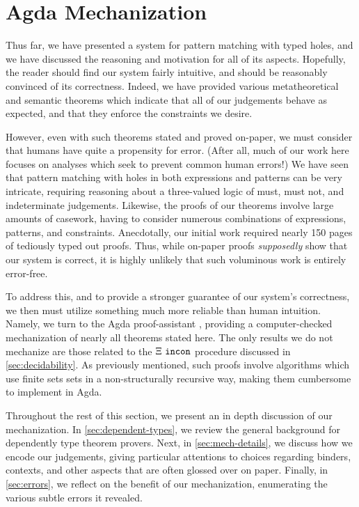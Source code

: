 \section{Agda Mechanization}\label{sec:mechanization}
Thus far, we have presented a system for pattern matching with typed holes, and we have discussed the reasoning and motivation for all of its aspects. Hopefully, the reader should find our system fairly intuitive, and should be reasonably convinced of its correctness. Indeed, we have provided various metatheoretical and semantic theorems which indicate that all of our judgements behave as expected, and that they enforce the constraints we desire.

However, even with such theorems stated and proved on-paper, we must consider that humans have quite a propensity for error. (After all, much of our work here focuses on analyses which seek to prevent common human errors!) We have seen that pattern matching with holes in both expressions and patterns can be very intricate, requiring reasoning about a three-valued logic of must, must not, and indeterminate judgements. Likewise, the proofs of our theorems involve large amounts of casework, having to consider numerous combinations of expressions, patterns, and constraints. Anecdotally, our initial work required nearly 150 pages of tediously typed out proofs. Thus, while on-paper proofs \emph{supposedly} show that our system is correct, it is highly unlikely that such voluminous work is entirely error-free.

To address this, and to provide a stronger guarantee of our system's correctness, we then must utilize something much more reliable than human intuition. Namely, we turn to the Agda proof-assistant \cite{norell:thesis}, providing a computer-checked mechanization of nearly all theorems stated here. The only results we do not mechanize are those related to the $\Xi ~\mathtt{incon}$ procedure discussed in \autoref{sec:decidability}. As previously mentioned, such proofs involve algorithms which use finite sets sets in a non-structurally recursive way, making them cumbersome to implement in Agda.

Throughout the rest of this section, we present an in depth discussion of our mechanization. In \autoref{sec:dependent-types}, we review the general background for dependently type theorem provers. Next, in \autoref{sec:mech-details}, we discuss how we encode our judgements, giving particular attentions to choices regarding binders, contexts, and other aspects that are often glossed over on paper. Finally, in \autoref{sec:errors}, we reflect on the benefit of our mechanization, enumerating the various subtle errors it revealed. 

